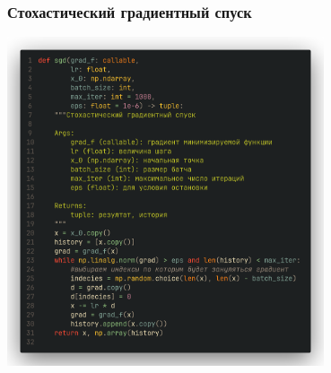 \documentclass[9pt]{beamer}
\begin{document}
\begin{frame}
    \frametitle{Стохастический градиентный спуск}
    \begin{center}
        \includegraphics[width=0.7\textwidth]{code_stochastic.png}    
    \end{center}
\end{frame}
\end{document}
